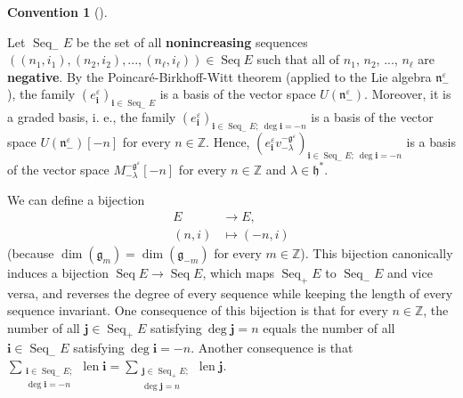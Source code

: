 \documentclass
[numbers=enddot,12pt,final,onecolumn,german,notitlepage]{scrartcl}%
\theoremstyle{definition}
\newtheorem{conv}[theo]{Convention}
\newenvironment{Convention}[1][]
{\begin{conv}[#1]\begin{leftbar}}
{\end{leftbar}\end{conv}}
\begin{document}
\begin{Convention}
Let $\operatorname*{Seq}\nolimits_{-}E$ be the set of all
\textbf{nonincreasing} sequences $\left(  \left(  n_{1},i_{1}\right)  ,\left(
n_{2},i_{2}\right)  ,...,\left(  n_{\ell},i_{\ell}\right)  \right)
\in\operatorname*{Seq}E$ such that all of $n_{1}$, $n_{2}$, $...$, $n_{\ell}$
are \textbf{negative}. By the Poincar\'{e}-Birkhoff-Witt theorem (applied to
the Lie algebra $\mathfrak{n}_{-}^{\varepsilon}$), the family $\left(
e_{\mathbf{i}}^{\varepsilon}\right)  _{\mathbf{i}\in\operatorname*{Seq}%
\nolimits_{-}E}$ is a basis of the vector space $U\left(  \mathfrak{n}%
_{-}^{\varepsilon}\right)  $. Moreover, it is a graded basis, i. e., the
family $\left(  e_{\mathbf{i}}^{\varepsilon}\right)  _{\mathbf{i}%
\in\operatorname*{Seq}\nolimits_{-}E;\ \deg\mathbf{i}=-n}$ is a basis of the
vector space $U\left(  \mathfrak{n}_{-}^{\varepsilon}\right)  \left[
-n\right]  $ for every $n\in\mathbb{Z}$. Hence, $\left(  e_{\mathbf{i}%
}^{\varepsilon}v_{-\lambda}^{-\mathfrak{g}^{\varepsilon}}\right)
_{\mathbf{i}\in\operatorname*{Seq}\nolimits_{-}E;\ \deg\mathbf{i}=-n}$ is a
basis of the vector space $M_{-\lambda}^{-\mathfrak{g}^{\varepsilon}}\left[
-n\right]  $ for every $n\in\mathbb{Z}$ and $\lambda\in\mathfrak{h}^{\ast}$.

We can define a bijection%
\begin{align*}
E  &  \rightarrow E,\\
\left(  n,i\right)   &  \mapsto\left(  -n,i\right)
\end{align*}
(because $\dim\left(  \mathfrak{g}_{m}\right)  =\dim\left(  \mathfrak{g}%
_{-m}\right)  $ for every $m\in\mathbb{Z}$). This bijection canonically
induces a bijection $\operatorname*{Seq}E\rightarrow\operatorname*{Seq}E$,
which maps $\operatorname*{Seq}\nolimits_{+}E$ to $\operatorname*{Seq}%
\nolimits_{-}E$ and vice versa, and reverses the degree of every sequence
while keeping the length of every sequence invariant. One consequence of this
bijection is that for every $n\in\mathbb{Z}$, the number of all $\mathbf{j}%
\in\operatorname*{Seq}\nolimits_{+}E$ satisfying$\ \deg\mathbf{j}=n$ equals
the number of all $\mathbf{i}\in\operatorname*{Seq}\nolimits_{-}E$
satisfying$\ \deg\mathbf{i}=-n$. Another consequence is that $\sum
\limits_{\substack{\mathbf{i}\in\operatorname*{Seq}\nolimits_{-}%
E;\\\deg\mathbf{i}=-n}}\operatorname*{len}\mathbf{i=}\sum
\limits_{\substack{\mathbf{j}\in\operatorname*{Seq}\nolimits_{+}%
E;\\\deg\mathbf{j}=n}}\operatorname*{len}\mathbf{j}$.


\end{Convention}
\end{document}
